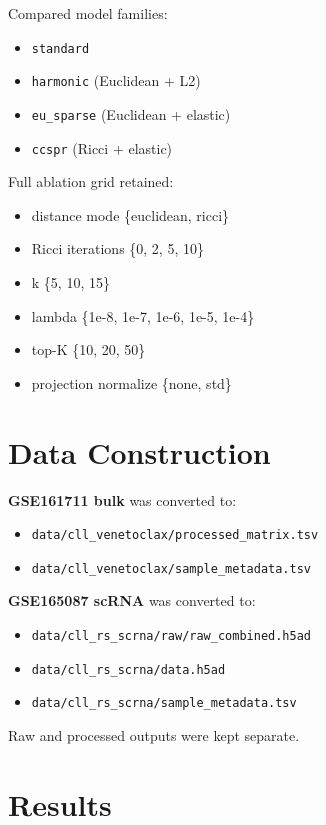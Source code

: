 \documentclass[11pt]{article}
\begin{document}
\noindent Compared model families:
\begin{itemize}
\item \texttt{standard}
\item \texttt{harmonic} (Euclidean + L2)
\item \texttt{eu\_sparse} (Euclidean + elastic)
\item \texttt{ccspr} (Ricci + elastic)
\end{itemize}

\noindent Full ablation grid retained:
\begin{itemize}
\item distance mode \{euclidean, ricci\}
\item Ricci iterations \{0, 2, 5, 10\}
\item k \{5, 10, 15\}
\item lambda \{1e-8, 1e-7, 1e-6, 1e-5, 1e-4\}
\item top-K \{10, 20, 50\}
\item projection normalize \{none, std\}
\end{itemize}

\section{Data Construction}
\textbf{GSE161711 bulk} was converted to:
\begin{itemize}
\item \texttt{data/cll\_venetoclax/processed\_matrix.tsv}
\item \texttt{data/cll\_venetoclax/sample\_metadata.tsv}
\end{itemize}

\textbf{GSE165087 scRNA} was converted to:
\begin{itemize}
\item \texttt{data/cll\_rs\_scrna/raw/raw\_combined.h5ad}
\item \texttt{data/cll\_rs\_scrna/data.h5ad}
\item \texttt{data/cll\_rs\_scrna/sample\_metadata.tsv}
\end{itemize}

Raw and processed outputs were kept separate.

\section{Results}
\end{document}
